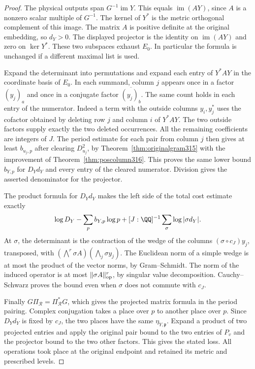 \documentclass[a4paper,11pt]{article}
\theoremstyle{definition}
\theoremstyle{remark}
\numberwithin{equation}{section}
\begin{document}
\begin{proof}
The physical outputs span \(G^{-1}\operatorname{im}Y\).
This equals \(\operatorname{im}(AY)\), since \(A\) is a
nonzero scalar multiple of \(G^{-1}\). The kernel of \(Y^*\)
is the metric orthogonal complement of this image. The matrix
\(A\) is positive definite at the original embedding, so
\(d_Y>0\). The displayed projector is the identity on
\(\operatorname{im}(AY)\) and zero on \(\ker Y^*\).
These two subspaces exhaust \(E_0\). In particular the
formula is unchanged if a different maximal list is used.

Expand the determinant into permutations and expand each
entry of \(Y^*AY\) in the coordinate basis of \(E_0\).
In each summand, column \(j\) appears once in a factor
\((y_j)_a\) and once in a conjugate factor
\(\overline{(y_j)_b}\). The same count holds in each entry
of the numerator. Indeed a term with the outside columns
\(y_i,y_j^*\) uses the cofactor obtained by deleting row
\(j\) and column \(i\) of \(Y^*AY\). The two outside
factors supply exactly the two deleted occurrences.
All the remaining coefficients are integers of \(J\).
The period estimate for each pair from column \(j\) then
gives at least \(b_{u_j,p}\) after clearing \(D_{u_j}^2\),
by Theorem~\ref{thm:originalgram315} with the improvement
of Theorem~\ref{thm:poscolumn316}. This proves the same
lower bound \(b_{Y,p}\) for \(D_Yd_Y\) and every entry of
the cleared numerator. Division gives the asserted
denominator for the projector.

The product formula for \(D_Y d_Y\) makes the left side
of the total cost estimate exactly
\[
 \log D_Y-\sum_p b_{Y,p}\log p+
                  [J:\QQ]^{-1}\sum_\sigma\log|\sigma d_Y|.
\]
At \(\sigma\), the determinant is the contraction of the
wedge of the columns \((\sigma\circ c_J)y_j\), transposed,
with \((\bigwedge^r\sigma A)(\bigwedge_j\sigma y_j)\).
The Euclidean norm of a simple wedge is at most the product
of the vector norms, by Gram--Schmidt. The norm of the
induced operator is at most \(\|\sigma A\|_{\rm op}^r\),
by singular value decomposition. Cauchy--Schwarz proves
the bound even when \(\sigma\) does not commute with \(c_J\).

Finally \(G\Pi_{\mathcal R}=\Pi_{\mathcal R}^*G\), which
gives the projected matrix formula in the period pairing.
Complex conjugation takes a place over \(p\) to another
place over \(p\). Since \(D_Yd_Y\) is fixed by \(c_J\),
the two places have the same \(\eta_{Y,\mathfrak p}\).
Expand a product of two projected entries and apply the
original pair bound to the two entries of \(P_v\) and
the projector bound to the two other factors. This gives
the stated loss. All operations took place at the original
endpoint and retained its metric and prescribed levels.
\end{proof}
\end{document}
